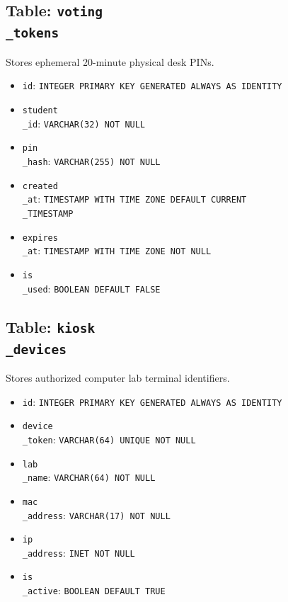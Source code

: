 \documentclass[12pt,a4paper,oneside]{report}
\begin{document}
\subsection{Table: \texttt{voting\\_tokens}}
Stores ephemeral 20-minute physical desk PINs.
\begin{itemize}
    \item \texttt{id}: \texttt{INTEGER PRIMARY KEY GENERATED ALWAYS AS IDENTITY}
    \item \texttt{student\\_id}: \texttt{VARCHAR(32) NOT NULL}
    \item \texttt{pin\\_hash}: \texttt{VARCHAR(255) NOT NULL}
    \item \texttt{created\\_at}: \texttt{TIMESTAMP WITH TIME ZONE DEFAULT CURRENT\\_TIMESTAMP}
    \item \texttt{expires\\_at}: \texttt{TIMESTAMP WITH TIME ZONE NOT NULL}
    \item \texttt{is\\_used}: \texttt{BOOLEAN DEFAULT FALSE}
\end{itemize}

\subsection{Table: \texttt{kiosk\\_devices}}
Stores authorized computer lab terminal identifiers.
\begin{itemize}
    \item \texttt{id}: \texttt{INTEGER PRIMARY KEY GENERATED ALWAYS AS IDENTITY}
    \item \texttt{device\\_token}: \texttt{VARCHAR(64) UNIQUE NOT NULL}
    \item \texttt{lab\\_name}: \texttt{VARCHAR(64) NOT NULL}
    \item \texttt{mac\\_address}: \texttt{VARCHAR(17) NOT NULL}
    \item \texttt{ip\\_address}: \texttt{INET NOT NULL}
    \item \texttt{is\\_active}: \texttt{BOOLEAN DEFAULT TRUE}
\end{itemize}
\end{document}

